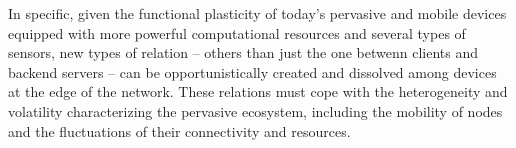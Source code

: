 In specific, given the functional plasticity of today's pervasive and mobile devices equipped with more powerful computational resources and several types of sensors, 
new types of relation -- others than just the one betwenn clients and backend servers -- can be opportunistically created and dissolved among devices at the edge of the network. These relations must cope with the heterogeneity and volatility characterizing the pervasive ecosystem, including the mobility of nodes and the fluctuations of their connectivity and resources. 













